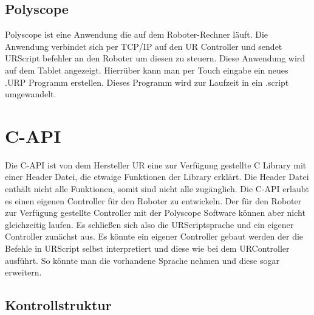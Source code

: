\subsection{Polyscope}
\label{urcontrol_polyscope_gru}

Polyscope ist eine Anwendung die auf dem Roboter-Rechner läuft. Die Anwendung verbindet sich per TCP/IP auf den UR Controller und sendet URScript befehler an den Roboter um diesen zu steuern.
Diese Anwendung wird auf dem Tablet angezeigt. Hierrüber kann man per Touch eingabe ein neues .URP Programm erstellen. Dieses Programm wird zur Laufzeit in ein .script umgewandelt.

\section{C-API}
\label{sec:rest_prinzip_gru}

Die C-API ist von dem Hersteller UR eine zur Verfügung gestellte C Library mit einer Header Datei, die etwaige Funktionen der Library erklärt. Die Header Datei enthält nicht alle Funktionen, somit sind nicht alle zugänglich. Die C-API erlaubt es einen eigenen Controller für den Roboter zu entwickeln. Der für den Roboter zur Verfügung gestellte Controller mit der Polyscope Software können aber nicht gleichzeitig laufen. Es schließen sich also die URScriptsprache und ein eigener Controller zunächst aus. Es könnte ein eigener Controller gebaut werden der die Befehle in URScript selbst interpretiert und diese wie bei dem URController ausführt. So könnte man die vorhandene Sprache nehmen und diese sogar erweitern.

\subsection{Kontrollstruktur}
\label{capi_control_loop_gru}	

